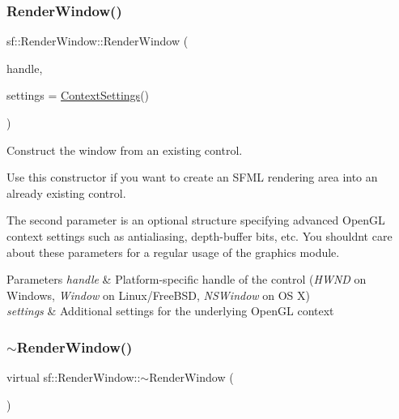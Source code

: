 \subsubsection{\texorpdfstring{Render\+Window()}{RenderWindow()}\hspace{0.1cm}{\footnotesize\ttfamily [3/3]}}
{\footnotesize\ttfamily sf\+::\+Render\+Window\+::\+Render\+Window (\begin{DoxyParamCaption}\item[{Window\+Handle}]{handle,  }\item[{const \hyperlink{structsf_1_1_context_settings}{Context\+Settings} \&}]{settings = {\ttfamily \hyperlink{structsf_1_1_context_settings}{Context\+Settings}()} }\end{DoxyParamCaption})\hspace{0.3cm}{\ttfamily [explicit]}}



Construct the window from an existing control. 

Use this constructor if you want to create an S\+F\+ML rendering area into an already existing control.

The second parameter is an optional structure specifying advanced Open\+GL context settings such as antialiasing, depth-\/buffer bits, etc. You shouldn\textquotesingle{}t care about these parameters for a regular usage of the graphics module.


\begin{DoxyParams}{Parameters}
{\em handle} & Platform-\/specific handle of the control ({\itshape H\+W\+ND} on Windows, {\itshape Window} on Linux/\+Free\+B\+SD, {\itshape N\+S\+Window} on OS X) \\
\hline
{\em settings} & Additional settings for the underlying Open\+GL context \\
\hline
\end{DoxyParams}
\mbox{\label{classsf_1_1_render_window_a3407e36bfc1752d723140438a825365c}} 
\subsubsection{\texorpdfstring{$\sim$\+Render\+Window()}{~RenderWindow()}}
{\footnotesize\ttfamily virtual sf\+::\+Render\+Window\+::$\sim$\+Render\+Window (\begin{DoxyParamCaption}{ }\end{DoxyParamCaption})\hspace{0.3cm}{\ttfamily [virtual]}}



